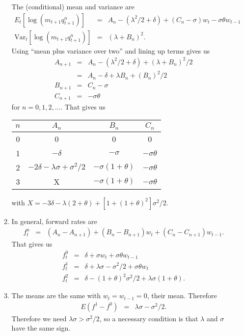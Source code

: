 \documentclass[11pt]{article}
\begin{document}
\begin{enumerate}
\begin{enumerate}
The (conditional) mean and variance are
\begin{eqnarray*}
    E_t [ \log (m_{t+1} q_{t+1}^n)] &=&
            A_n - (\lambda^2/2 + \delta)
            + (C_n-\sigma) w_t - \sigma \theta w_{t-1} \\
    \mbox{Var}_t [\log (m_{t+1} q_{t+1}^n)] &=&
            (\lambda+B_n)^2 .
\end{eqnarray*}
Using ``mean plus variance over two'' and lining up terms gives us
\begin{eqnarray*}
        A_{n+1} &=& A_n - (\lambda^2/2 + \delta) + (\lambda+B_n)^2/2 \\
                &=& A_n - \delta + \lambda B_n + (B_n)^2/2 \\
        B_{n+1} &=& C_n - \sigma \\
        C_{n+1} &=& - \sigma \theta
\end{eqnarray*}
for $n=0,1,2,\ldots$.
That gives us
\begin{center}
\begin{tabular}{cccc}
        $n$  & $A_n$ & $B_n$ & $C_n$ \\
        \midrule
        0   &  0 & 0 & 0 \\
        1   &  $-\delta$ & $-\sigma$ & $-\sigma\theta$  \\
        2   &  $-2 \delta - \lambda\sigma + \sigma^2/2$   &  $-\sigma(1+\theta)$ & $-\sigma\theta$ \\
        3   &  X  &  $-\sigma(1+\theta)$ & $-\sigma\theta$
\end{tabular}
\end{center}
with
$X = - 3 \delta - \lambda (2+\theta)+ [1 + (1+\theta)^2] \sigma^2/2 $.

\item In general, forward rates are
\begin{eqnarray*}
    f^n_t &=& (A_n - A_{n+1}) + (B_n - B_{n+1}) w_t + (C_n - C_{n+1}) w_{t-1} .
\end{eqnarray*}
That gives us
\begin{eqnarray*}
    f^0_t &=& \delta + \sigma w_t + \sigma \theta  w_{t-1} \\
    f^1_t &=& \delta + \lambda\sigma - \sigma^2/2 + \sigma \theta w_t  \\
    f^2_t &=& \delta - (1+\theta)^2 \sigma^2/2 + \lambda \sigma (1+\theta) .
\end{eqnarray*}

\item The means are the same with $w_t = w_{t-1} = 0$, their mean.
Therefore
\begin{eqnarray*}
   E (f^1 - f^0) &=& \lambda \sigma - \sigma^2/2 .
\end{eqnarray*}
Therefore we need $\lambda\sigma > \sigma^2/2 $,
so a necessary condition is that $\lambda$ and $\sigma$ have the same sign.


\end{enumerate}
\end{enumerate}
\end{document}
